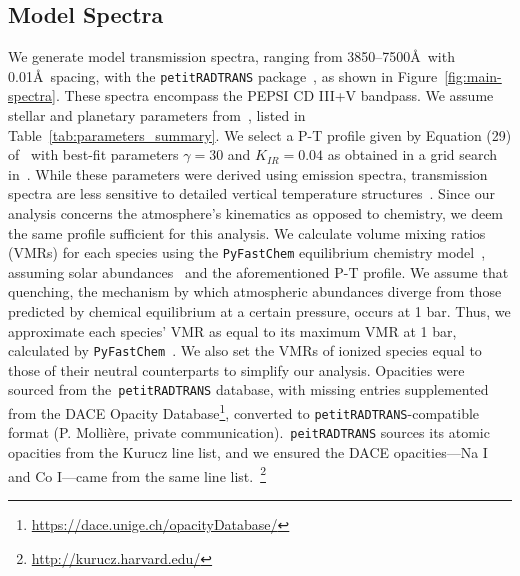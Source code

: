 \documentclass[twocolumn]{aastex631}
\newcommand{\code}[1]{\texttt{#1}}
\begin{document}
        \subsection{Model Spectra}\label{subsec:Model Spectra}
            We generate model transmission spectra, ranging from 3850--7500\AA\ with 0.01\AA\ spacing, with the \code{petitRADTRANS} package~\citep{petitRADTRANS}, as shown in Figure~\ref{fig:main-spectra}. These spectra encompass the PEPSI CD III+V bandpass. We assume stellar and planetary parameters from~\citet{Lund2017}, listed in Table~\ref{tab:parameters_summary}. We select a P-T profile given by Equation (29) of~\citet{Guillot2010} with best-fit parameters $\gamma = 30$ and $K_{IR} = 0.04$ as obtained in a grid search in~\citet{Johnson2023}. While these parameters were derived using emission spectra, transmission spectra are less sensitive to detailed vertical temperature structures~\citep{Kesseli2020}. Since our analysis concerns the atmosphere's kinematics as opposed to chemistry, we deem the same profile sufficient for this analysis. 
            We calculate volume mixing ratios (VMRs) for each species using the \code{PyFastChem} equilibrium chemistry model~\citep{Stock2018, Stock2022, Kitzmann2023}, assuming solar abundances~\citep{Asplund2021} and the aforementioned P-T profile. We assume that quenching, the mechanism by which atmospheric abundances diverge from those predicted by chemical equilibrium at a certain pressure, occurs at 1 bar. Thus, we approximate each species' VMR as equal to its maximum VMR at 1 bar, calculated by \code{PyFastChem}~\citep{Johnson2023,Petz2023}. We also set the VMRs of ionized species equal to those of their neutral counterparts to simplify our analysis. Opacities were sourced from the~\code{petitRADTRANS} database, with missing entries supplemented from the DACE Opacity Database\footnote{\url{https://dace.unige.ch/opacityDatabase/}}, converted to \code{petitRADTRANS}-compatible format (P. Mollière, private communication).~\code{peitRADTRANS} sources its atomic opacities from the Kurucz line list, and we ensured the DACE opacities---Na I and Co I---came from the same line list.~\footnote{\url{http://kurucz.harvard.edu/}}
        
\end{document}
